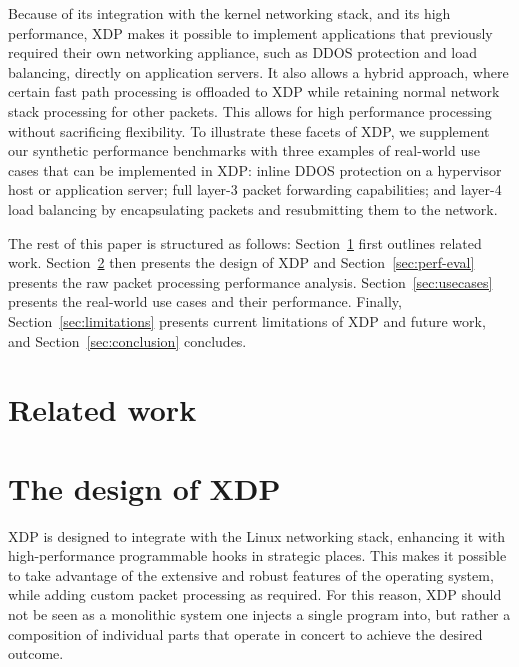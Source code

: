 \documentclass[10pt,sigconf]{acmart}
\begin{document}
Because of its integration with the kernel networking stack, and its high
performance, XDP makes it possible to implement applications that previously
required their own networking appliance, such as DDOS protection and load
balancing, directly on application servers. It also allows a hybrid approach,
where certain fast path processing is offloaded to XDP while retaining normal
network stack processing for other packets. This allows for high performance
processing without sacrificing flexibility. To illustrate these facets of XDP,
we supplement our synthetic performance benchmarks with three examples of
real-world use cases that can be implemented in XDP: inline DDOS protection on a
hypervisor host or application server; full layer-3 packet forwarding
capabilities; and layer-4 load balancing by encapsulating packets and
resubmitting them to the network.

The rest of this paper is structured as follows: Section~\ref{sec:related-work}
first outlines related work. Section~\ref{sec:design} then presents the design
of XDP and Section~\ref{sec:perf-eval} presents the raw packet processing
performance analysis. Section~\ref{sec:usecases} presents the real-world use
cases and their performance. Finally, Section~\ref{sec:limitations} presents
current limitations of XDP and future work, and Section~\ref{sec:conclusion}
concludes.

\section{Related work}%
\label{sec:related-work}
\section{The design of XDP}
\label{sec:design}
XDP is designed to integrate with the Linux networking stack, enhancing it with
high-performance programmable hooks in strategic places. This makes it possible
to take advantage of the extensive and robust features of the operating system,
while adding custom packet processing as required. For this reason, XDP should
not be seen as a monolithic system one injects a single program into, but rather
a composition of individual parts that operate in concert to achieve the desired
outcome.
\end{document}
